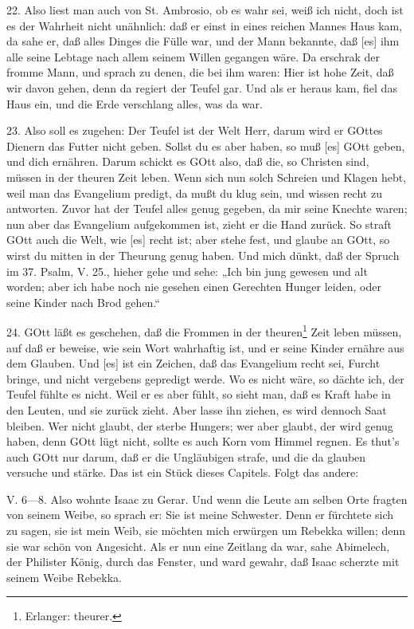 22. Also liest man auch von St. Ambrosio, ob es wahr sei, weiß ich nicht, doch ist es der Wahrheit nicht unähnlich: daß er einst in eines reichen Mannes Haus kam, da sahe er, daß alles Dinges die Fülle war, und der Mann bekannte, daß [es] ihm alle seine Lebtage nach allem seinem Willen gegangen wäre. Da erschrak der fromme Mann, und sprach zu denen, die bei ihm waren: Hier ist hohe Zeit, daß wir davon gehen, denn da regiert der Teufel gar. Und als er heraus kam, fiel das Haus ein, und die Erde verschlang alles, was da war.

23. Also soll es zugehen: Der Teufel ist der Welt Herr, darum wird er GOttes Dienern das Futter nicht geben. Sollst du es aber haben, so muß [es] GOtt geben, und dich ernähren. Darum schickt es GOtt also, daß die, so Christen sind, müssen in der theuren Zeit leben. Wenn sich nun solch Schreien und Klagen hebt, weil man das Evangelium predigt, da mußt du klug sein, und wissen recht zu antworten. Zuvor hat der Teufel alles genug gegeben, da mir seine Knechte waren; nun aber das Evangelium aufgekommen ist, zieht er die Hand zurück. So straft GOtt auch die Welt, wie [es] recht ist; aber stehe fest, und glaube an GOtt, so wirst du mitten in der Theurung genug haben. Und mich dünkt, daß der Spruch im 37. Psalm, V. 25., hieher gehe und sehe: „Ich bin jung gewesen und alt worden; aber ich habe noch nie gesehen einen Gerechten Hunger leiden, oder seine Kinder nach Brod gehen.“

24. GOtt läßt es geschehen, daß die Frommen in der theuren\footnote{Erlanger: theurer.} Zeit leben müssen, auf daß er beweise, wie sein Wort wahrhaftig ist, und er seine Kinder ernähre aus dem Glauben. Und [es] ist ein Zeichen, daß das Evangelium recht sei, Furcht bringe, und nicht vergebens gepredigt werde. Wo es nicht wäre, so dächte ich, der Teufel fühlte es nicht. Weil er es aber fühlt, so sieht man, daß es Kraft habe in den Leuten, und sie zurück zieht. Aber lasse ihn ziehen, es wird dennoch Saat bleiben. Wer nicht glaubt, der sterbe Hungers; wer aber glaubt, der wird genug haben, denn GOtt lügt nicht, sollte es auch Korn vom Himmel regnen. Es thut’s auch GOtt nur darum, daß er die Ungläubigen strafe, und die da glauben versuche und stärke. Das ist ein Stück dieses Capitels. Folgt das andere:

\begin{schriftzitat}
V. 6—8. Also wohnte Isaac zu Gerar. Und wenn die Leute am selben Orte fragten von seinem Weibe, so sprach er: Sie ist meine Schwester. Denn er fürchtete sich zu sagen, sie ist mein Weib, sie möchten mich erwürgen um Rebekka willen; denn sie war schön von Angesicht. Als er nun eine Zeitlang da war, sahe Abimelech, der Philister König, durch das Fenster, und ward gewahr, daß Isaac scherzte mit seinem Weibe Rebekka.
\end{schriftzitat}

